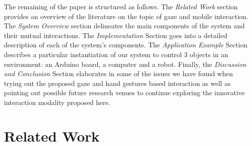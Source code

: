 \documentclass[jou,a4paper,notxfonts]{apa}
\begin{document}
The remaining of the paper is structured as follows. The \emph{Related Work} section provides an overview of the literature on the topic of gaze and mobile interaction. The \emph{System Overview} section delineates the main components of the system and their mutual interactions. The \emph{Implementation} Section goes into a detailed description of each of the system's components. The \emph{Application Example} Section describes a particular instantiation of our system to control 3 objects in an environment: an Arduino board, a computer and a robot. Finally, the \emph{Discussion and Conclusion} Section elaborates in some of the issues we have found when trying out the proposed gaze and hand gestures based interaction as well as pointing out possible future research venues to continue exploring the innovative interaction modality proposed here.






\section{Related Work}
\end{document}
